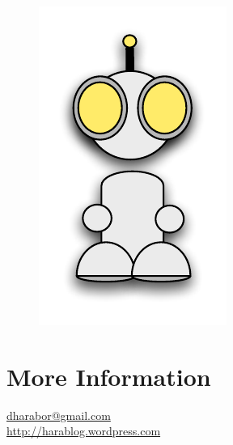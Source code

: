  \begin{figure}
\vspace{-5.5em}
		\includegraphics[width=0.2\columnwidth]{diagrams/robot_front.pdf}
 \end{figure}

\section{More Information}
{\Huge \url{dharabor@gmail.com } } \newline \\ 
{ \Huge \url{http://harablog.wordpress.com }}
